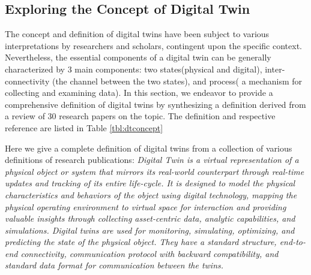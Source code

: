 %
\subsection{Exploring the Concept of Digital Twin}

The concept and definition of digital twins have been subject to various interpretations by researchers and scholars, contingent upon the specific context. Nevertheless, the essential components of a digital twin can be generally characterized by 3 main components: two states(physical and digital), inter-connectivity (the channel between the two states), and process( a mechanism for collecting and examining data). In this section, we endeavor to provide a comprehensive definition of digital twins by synthesizing a definition derived from a  review of 30 research papers on the topic. The definition and respective reference are listed in Table \ref{tbl:dtconcept}

Here we give a complete definition of digital twins from a collection of various definitions of research publications: \textit{ Digital Twin is a virtual representation of a physical object or system that mirrors its real-world counterpart through real-time updates and tracking of its entire life-cycle. It is designed to model the physical characteristics and behaviors of the object using digital technology, mapping the physical operating environment to virtual space for interaction and providing valuable insights through collecting asset-centric data, analytic capabilities, and simulations. Digital twins are used for monitoring, simulating, optimizing, and predicting the state of the physical object. They have a standard structure, end-to-end connectivity, communication protocol with backward compatibility, and standard data format for communication between the twins.}

